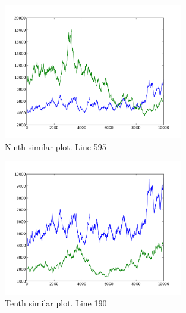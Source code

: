 \begin{figure}[h!]
    \centering
    \includegraphics[width=0.7\textwidth]{images/595.png}
    \caption{Ninth similar plot.  Line 595}
    \label{fig:ex1_9}
\end{figure}

\begin{figure}[h!]
    \centering
    \includegraphics[width=0.7\textwidth]{images/190.png}
    \caption{Tenth similar plot.  Line 190}
    \label{fig:ex1_10}
\end{figure}
